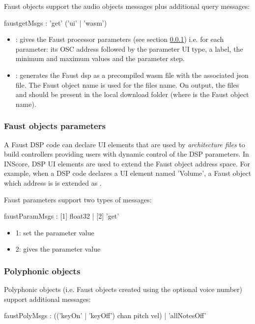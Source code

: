 \documentclass[a4paper,twoside]{article}
\newcommand{\subsublevel}[1]	{\subsubsection{#1}}
\begin{document}
Faust objects support the audio objects messages plus additional query messages:

\begin{rail}
faustgetMsgs : 'get' ('ui' | 'wasm')
\end{rail}

\begin{itemize}
\item {}: gives the Faust processor parameters (see section \ref{webFaustParams}) i.e. for each parameter: its OSC address followed by the parameter UI type, a label, the minimum and maximum values and the parameter step.
\item {}: generates the Faust dsp as a precompiled wasm file with the associated json file. The Faust object name is used for the files name. On output, the files  and  should be present in the local download folder (where  is the Faust object name).
\end{itemize}


\subsublevel{Faust objects parameters}
\label{webFaustParams}

A Faust DSP code can declare UI elements that are used by \emph{architecture files} to build controllers providing users with dynamic control of the DSP parameters. In INScore, DSP UI elements are used to extend the Faust object address space. For example, when a DSP code declares a UI element named 'Volume', a Faust object which address is  is extended as .

Faust parameters support two types of messages:

\begin{rail}
faustParamMsgs : [1] float32 | [2] 'get'
\end{rail}

\begin{itemize}
\item 1: set the parameter value
\item 2: gives the parameter value
\end{itemize}


\subsublevel{Polyphonic objects}
\label{webFaustPoly}

Polyphonic objects (i.e. Faust objects created using the optional voice number) support additional messages:

\begin{rail}
faustPolyMsgs : (('keyOn' | 'keyOff') chan pitch vel)
				| 'allNotesOff'
\end{rail}
\end{document}
